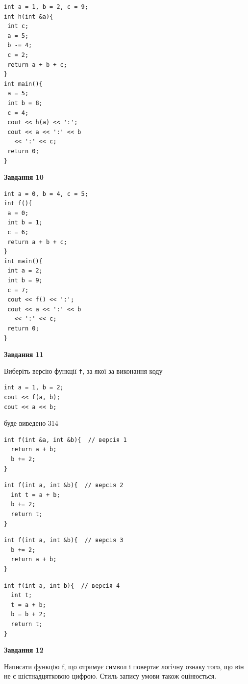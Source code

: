 \documentclass[12pt, ukrainian]{article}
\def\code#1{\Verb!#1!}
\begin{document}
{\begin {large}
\begin{minipage}[t]{7.0cm}
\begin{verbatim}
int a = 1, b = 2, c = 9;
int h(int &a){
 int c;
 a = 5;
 b -= 4;
 c = 2;
 return a + b + c;
}
int main(){
 a = 5;
 int b = 8;
 c = 4;
 cout << h(a) << ':';
 cout << a << ':' << b 
   << ':' << c;
 return 0;
}
\end{verbatim}



\begin{center}
\textbf{Завдання 10}
\end{center}
\vspace{-8mm}

\begin{verbatim}
int a = 0, b = 4, c = 5;
int f(){
 a = 0;
 int b = 1;
 c = 6;
 return a + b + c;
}
int main(){
 int a = 2;
 int b = 9;
 c = 7;
 cout << f() << ':';
 cout << a << ':' << b 
   << ':' << c;
 return 0;
}
\end{verbatim}

\end{minipage}
\vline \hspace{1mm}
\begin{minipage}[t]{11.0cm}

\begin{center}
\textbf{Завдання 11}
\end{center}
Виберіть версію функції \code{f}, за якої за виконання коду
\begin{verbatim}
int a = 1, b = 2;
cout << f(a, b);
cout << a << b;
\end{verbatim}

буде виведено 314

\begin{verbatim}
int f(int &a, int &b){  // версія 1
  return a + b;
  b += 2;
}
\end{verbatim}

\vspace{-8mm}\begin{verbatim}
int f(int a, int &b){  // версія 2
  int t = a + b;
  b += 2;
  return t;
}
\end{verbatim}

\vspace{-8mm}\begin{verbatim}
int f(int a, int &b){  // версія 3
  b += 2;
  return a + b;
}
\end{verbatim}

\vspace{-8mm}\begin{verbatim}
int f(int a, int b){  // версія 4
  int t;
  t = a + b;
  b = b + 2;
  return t;
}
\end{verbatim}



\begin{center}
\textbf{Завдання 12}
\end{center}

Написати функцiю f, що отримує символ i повертає логічну ознаку того, що вiн не є шістнадцятковою цифрою. Стиль запису умови також оцінюється.\par

\end{minipage}

\end {large}}
\newpage
\end{document}
